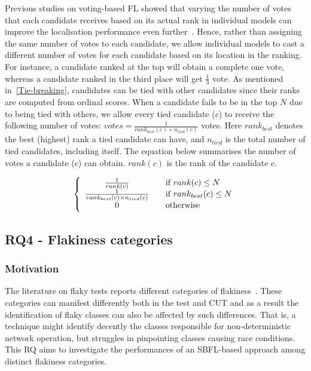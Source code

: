 Previous studies on voting-based FL showed that varying the number of votes that each candidate receives based on its actual rank in individual models can improve the localisation performance even further~\cite{Sohn2021ea,Sohn2019aa}.
Hence, rather than assigning the same number of votes to each candidate, we allow individual models to cast a different number of votes for each candidate based on its location in the ranking. 
For instance, a candidate ranked at the top will obtain a complete one vote, whereas a candidate ranked in the third place will get $\frac{1}{3}$ vote. 
As mentioned in~\ref{Tie-breaking}, candidates can be tied with other candidates since their ranks are computed from ordinal scores. When a candidate fails to be in the top $N$ due to being tied with others, we allow every tied candidate ($c$) to receive the following number of votes:
$votes = \frac{1}{rank_{best}(c) \times n_{tied}(c)}$ votes. 
Here $rank_{best}$ denotes the best (highest) rank a tied candidate can have, and $n_{tied}$ is the total number of tied candidates, including itself. The equation below summarises the number of votes a candidate ($c$) can obtain. $rank(c)$ is the rank of the candidate $c$. 

\vspace{-4mm}
\[
\left\{ 
  \begin{array}{ c l }
    \frac{1}{rank(c)} & \quad \textrm{if } rank(c) \leq N \\
    \frac{1}{rank_{best}(c) \times n_{tied}(c)} & \quad \textrm{if } rank_{best}(c) \leq N \\
    0                 & \quad \textrm{otherwise}
  \end{array}
\right.
\]

\subsection{RQ4 - Flakiness categories}
\subsubsection{Motivation}
The literature on flaky tests reports different categories of flakiness~\cite{Luo2014,Parry2021,Lam2020a,Gruber2021}.
These categories can manifest differently both in the test and CUT and as a result the identification of flaky classes can also be affected by such differences.
That is, a technique might identify decently the classes responsible for non-deterministic network operation, but struggles in pinpointing classes causing race conditions.
This RQ aims to investigate the performances of an SBFL-based approach among distinct flakiness categories.

